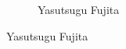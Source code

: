 \begin{frame}[plain]
\begin{figure}[h]
\begin{subfigure}{0.3\textwidth}
	\caption{Yasutsugu Fujita}
	\end{subfigure}
	\end{figure}
\end{frame}


